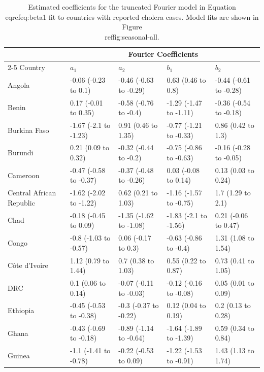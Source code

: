 \documentclass[
]{book}
\begin{document}
\begin{table}[!h]
\centering
\caption{\label{tab:seasonal-table}Estimated coefficients for the truncated Fourier model in Equation \\eqref{eq:beta1} fit to countries with reported cholera cases. Model fits are shown in Figure \\ref{fig:seasonal-all}.}
\centering
\fontsize{11.75}{13.75}\selectfont
\begin{tabular}[t]{l|l|l|l|l}
\hline
\multicolumn{1}{c|}{ } & \multicolumn{4}{c}{Fourier Coefficients} \\
\cline{2-5}
Country & $a_1$ & $a_2$ & $b_1$ & $b_2$\\
\hline
Angola & -0.06 (-0.23 to 0.1) & -0.46 (-0.63 to -0.29) & 0.63 (0.46 to 0.8) & -0.44 (-0.61 to -0.28)\\
\hline
Benin & 0.17 (-0.01 to 0.35) & -0.58 (-0.76 to -0.4) & -1.29 (-1.47 to -1.11) & -0.36 (-0.54 to -0.18)\\
\hline
Burkina Faso & -1.67 (-2.1 to -1.23) & 0.91 (0.46 to 1.35) & -0.77 (-1.21 to -0.33) & 0.86 (0.42 to 1.3)\\
\hline
Burundi & 0.21 (0.09 to 0.32) & -0.32 (-0.44 to -0.2) & -0.75 (-0.86 to -0.63) & -0.16 (-0.28 to -0.05)\\
\hline
Cameroon & -0.47 (-0.58 to -0.37) & -0.37 (-0.48 to -0.26) & 0.03 (-0.08 to 0.14) & 0.13 (0.03 to 0.24)\\
\hline
Central African Republic & -1.62 (-2.02 to -1.22) & 0.62 (0.21 to 1.03) & -1.16 (-1.57 to -0.75) & 1.7 (1.29 to 2.1)\\
\hline
Chad & -0.18 (-0.45 to 0.09) & -1.35 (-1.62 to -1.08) & -1.83 (-2.1 to -1.56) & 0.21 (-0.06 to 0.47)\\
\hline
Congo & -0.8 (-1.03 to -0.57) & 0.06 (-0.17 to 0.3) & -0.63 (-0.86 to -0.4) & 1.31 (1.08 to 1.54)\\
\hline
Côte d’Ivoire & 1.12 (0.79 to 1.44) & 0.7 (0.38 to 1.03) & 0.55 (0.22 to 0.87) & 0.73 (0.41 to 1.05)\\
\hline
DRC & 0.1 (0.06 to 0.14) & -0.07 (-0.11 to -0.03) & -0.12 (-0.16 to -0.08) & 0.05 (0.01 to 0.09)\\
\hline
Ethiopia & -0.45 (-0.53 to -0.38) & -0.3 (-0.37 to -0.22) & 0.12 (0.04 to 0.19) & 0.2 (0.13 to 0.28)\\
\hline
Ghana & -0.43 (-0.69 to -0.18) & -0.89 (-1.14 to -0.64) & -1.64 (-1.89 to -1.39) & 0.59 (0.34 to 0.84)\\
\hline
Guinea & -1.1 (-1.41 to -0.78) & -0.22 (-0.53 to 0.09) & -1.22 (-1.53 to -0.91) & 1.43 (1.13 to 1.74)\\

\end{tabular}
\end{table}
\end{document}

